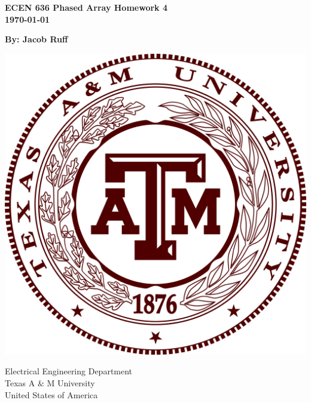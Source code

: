 \begin{titlepage}
	\begin{center}
		\vspace*{1cm}

		\Huge
		\textbf{ECEN 636 Phased Array Homework 4}
		\vspace{.10cm}
		\LARGE
		\\
		\vspace{1.5cm}
		\textbf{\today}

		\textbf{By: Jacob Ruff}

		\vfill

		\vspace{0.4cm}

		\includegraphics[width=.6\columnwidth]{TAMLogo.png}

		\vspace{0.4cm}
		\Large
		Electrical Engineering Department
		\\
		Texas A \& M University
		\\
		United States of America
		\\
	\end{center}
\end{titlepage}
